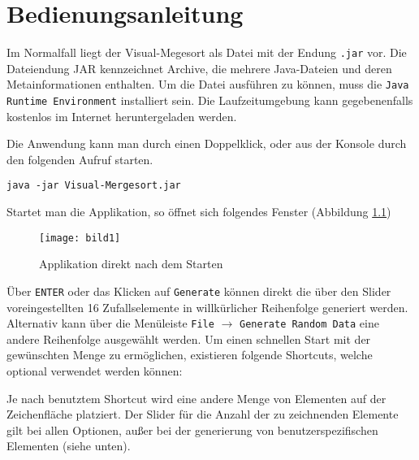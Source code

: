 \chapter{Bedienungsanleitung}\label{chap:bedienungsanleitung}

Im Normalfall liegt der Visual-Megesort als Datei mit der Endung \texttt{.jar} vor. Die Dateiendung JAR kennzeichnet Archive, die mehrere Java-Dateien und deren Metainformationen enthalten. Um die Datei ausführen zu können, muss die \texttt{Java Runtime Environment} installiert sein. Die Laufzeitumgebung kann gegebenenfalls kostenlos im Internet heruntergeladen werden.

Die Anwendung kann man durch einen Doppelklick, oder aus der Konsole durch den folgenden Aufruf starten.

\begin{verbatim}
java -jar Visual-Mergesort.jar
\end{verbatim}

Startet man die Applikation, so öffnet sich folgendes Fenster (Abbildung \ref{figure:start-app})

\begin{figure}[!htb]
    \centering
      \texttt{[image: bild1]}
    \caption{Applikation direkt nach dem Starten}
    \label{figure:start-app}
\end{figure}

Über \texttt{ENTER} oder das Klicken auf \texttt{Generate} können direkt die über den Slider voreingestellten 16 Zufallselemente in willkürlicher Reihenfolge generiert werden. Alternativ kann über die Menüleiste \texttt{File} $\rightarrow$ \texttt{Generate Random Data} eine andere Reihenfolge ausgewählt werden. Um einen schnellen Start mit der gewünschten Menge zu ermöglichen, existieren folgende Shortcuts, welche optional verwendet werden können:

Je nach benutztem Shortcut wird eine andere Menge von Elementen auf der Zeichenfläche platziert. Der Slider für die Anzahl der zu zeichnenden Elemente gilt bei allen Optionen, außer bei der generierung von benutzerspezifischen Elementen (siehe unten).

